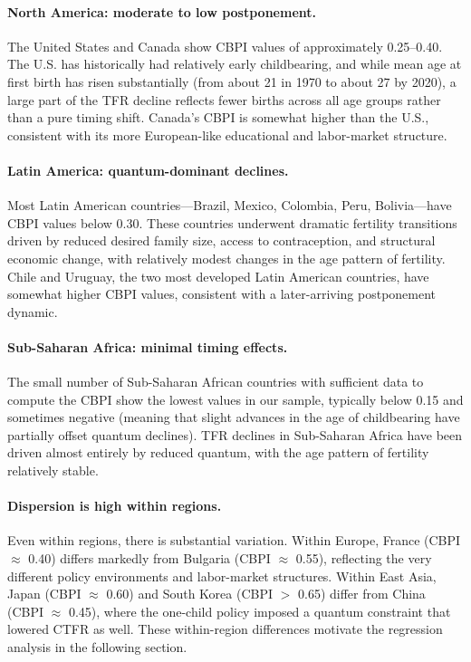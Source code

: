 \documentclass[12pt]{article}
\begin{document}
\paragraph{North America: moderate to low postponement.}
The United States and Canada show CBPI values of approximately 0.25--0.40.
The U.S. has historically had relatively early childbearing, and while
mean age at first birth has risen substantially (from about 21 in 1970
to about 27 by 2020), a large part of the TFR decline reflects fewer
births across all age groups rather than a pure timing shift.  Canada's
CBPI is somewhat higher than the U.S., consistent with its more
European-like educational and labor-market structure.

\paragraph{Latin America: quantum-dominant declines.}
Most Latin American countries---Brazil, Mexico, Colombia, Peru, Bolivia---have
CBPI values below 0.30.  These countries underwent dramatic fertility
transitions driven by reduced desired family size, access to
contraception, and structural economic change, with relatively modest
changes in the age pattern of fertility.  Chile and Uruguay, the two
most developed Latin American countries, have somewhat higher CBPI
values, consistent with a later-arriving postponement dynamic.

\paragraph{Sub-Saharan Africa: minimal timing effects.}
The small number of Sub-Saharan African countries with sufficient data
to compute the CBPI show the lowest values in our sample, typically
below 0.15 and sometimes negative (meaning that slight advances in
the age of childbearing have partially offset quantum declines).
TFR declines in Sub-Saharan Africa have been driven almost entirely by
reduced quantum, with the age pattern of fertility relatively stable.

\paragraph{Dispersion is high within regions.}
Even within regions, there is substantial variation.  Within Europe,
France (CBPI $\approx$ 0.40) differs markedly from Bulgaria
(CBPI $\approx$ 0.55), reflecting the very different policy
environments and labor-market structures.  Within East Asia, Japan
(CBPI $\approx$ 0.60) and South Korea (CBPI $>$ 0.65) differ from
China (CBPI $\approx$ 0.45), where the one-child policy imposed a
quantum constraint that lowered CTFR as well.  These within-region
differences motivate the regression analysis in the following section.
\end{document}
